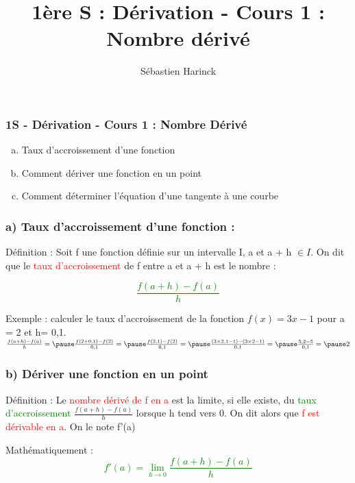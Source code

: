 \documentclass[t]{beamer}
\title{1ère S : Dérivation - Cours 1 : Nombre dérivé}
\author{Sébastien Harinck}
\institute{www.cours-futes.com}
\date{}
\begin{document}
\begin{frame}
\frametitle{1S - Dérivation - Cours 1 : Nombre Dérivé}
\begin{enumerate}[a)]
\item Taux d'accroissement d'une fonction
\item Comment dériver une fonction en un point
\item Comment déterminer l'équation d'une tangente à une courbe
\end{enumerate}
\end{frame}

\begin{frame}[label=pagebanale]
\frametitle{a)  Taux d'accroissement d'une fonction : }
\pause
\begin{block}{Définition :}
\pause
Soit f une fonction définie sur un intervalle I, \pause a et a + h $ \in I$. \pause
On dit que le \textcolor{red}{taux d'accroissement} de f \pause entre a et a + h \pause est le nombre : 
\pause
\end{block}

{\huge \textcolor{green}{\[\frac{f(a+h) - f(a)}{h}\]}}

\pause
\begin{exampleblock}{Exemple :}
\pause
calculer le taux d'accroissement \pause
de la fonction $f(x)=3x -1$ \pause 
pour a = 2 \pause et h= 0,1. \\
\pause
\( \frac{f(a+h) - f(a)}{h} = \pause
\frac{f(2+0,1) - f(2)}{0,1} = \pause 
\frac{f(2,1) - f(2)}{0,1} = \pause
\frac{(3 \times 2,1 - 1) - (3 \times 2 - 1)}{0,1} = \pause
\frac{ 5,2 - 5}{0,1} = \pause
2
\)
\end{exampleblock}
\end{frame}

\begin{frame}[label=pagebanale]
\frametitle{b) Dériver une fonction en un point}
\pause
\begin{block}{Définition :}
\pause
Le \textcolor{red}{nombre dérivé de f en a} est la limite, \pause si elle existe, \pause du \textcolor{green}{taux d'accroissement} \pause
\(\frac{f(a+h) - f(a)}{h}\)
\pause
lorsque h tend vers 0. \pause 
On dit alors que \textcolor{red}{f est dérivable en a}. \pause On le note f'(a)
\pause
\end{block}
\begin{block}{Mathématiquement :}
\pause
{\Huge \textcolor{green}{\[ f'(a) = \lim\limits_{h \rightarrow 0}\frac{f(a+h) - f(a)}{h}\]}}
\end{block}
\end{frame}
\end{document}
